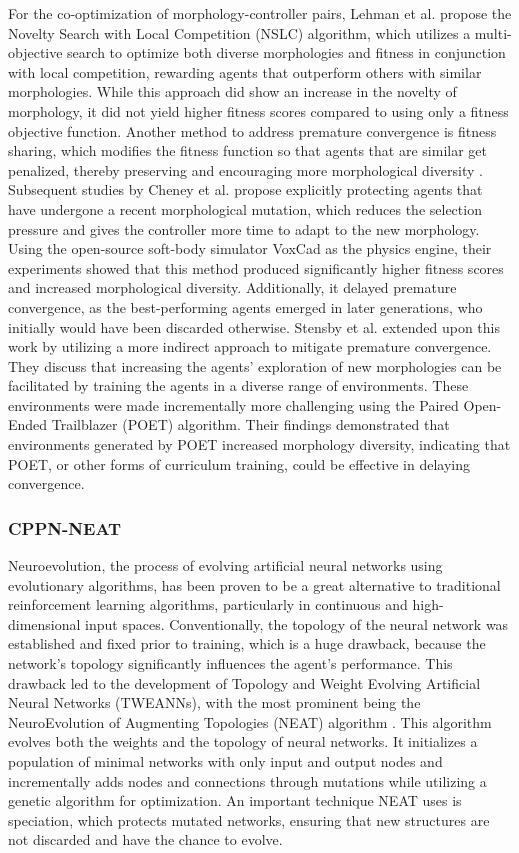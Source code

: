         For the co-optimization of morphology-controller pairs, Lehman et al. \cite{Lehman_2011} propose the Novelty Search with Local Competition (NSLC) algorithm, which utilizes a multi-objective search to optimize both diverse morphologies and fitness in conjunction with local competition, rewarding agents that outperform others with similar morphologies. While this approach did show an increase in the novelty of morphology, it did not yield higher fitness scores compared to using only a fitness objective function. Another method to address premature convergence is fitness sharing, which modifies the fitness function so that agents that are similar get penalized, thereby preserving and encouraging more morphological diversity \cite{McKay_2000}. Subsequent studies by Cheney et al. \cite{Cheney_2017} propose explicitly protecting agents that have undergone a recent morphological mutation, which reduces the selection pressure and gives the controller more time to adapt to the new morphology. Using the open-source soft-body simulator VoxCad as the physics engine, their experiments showed that this method produced significantly higher fitness scores and increased morphological diversity. Additionally, it delayed premature convergence, as the best-performing agents emerged in later generations, who initially would have been discarded otherwise. Stensby et al. \cite{Emma_Stensby_2021} extended upon this work by utilizing a more indirect approach to mitigate premature convergence. They discuss that increasing the agents' exploration of new morphologies can be facilitated by training the agents in a diverse range of environments. These environments were made incrementally more challenging using the Paired Open-Ended Trailblazer (POET) algorithm. Their findings demonstrated that environments generated by POET increased morphology diversity, indicating that POET, or other forms of curriculum training, could be effective in delaying convergence.

    \subsubsection{CPPN-NEAT}
        Neuroevolution, the process of evolving artificial neural networks using evolutionary algorithms, has been proven to be a great alternative to traditional reinforcement learning algorithms, particularly in continuous and high-dimensional input spaces. Conventionally, the topology of the neural network was established and fixed prior to training, which is a huge drawback, because the network's topology significantly influences the agent's performance. This drawback led to the development of Topology and Weight Evolving Artificial Neural Networks (TWEANNs), with the most prominent being the NeuroEvolution of Augmenting Topologies (NEAT) algorithm \cite{Stanley_2002}. This algorithm evolves both the weights and the topology of neural networks. It initializes a population of minimal networks with only input and output nodes and incrementally adds nodes and connections through mutations while utilizing a genetic algorithm for optimization. An important technique NEAT uses is speciation, which protects mutated networks, ensuring that new structures are not discarded and have the chance to evolve.
        
